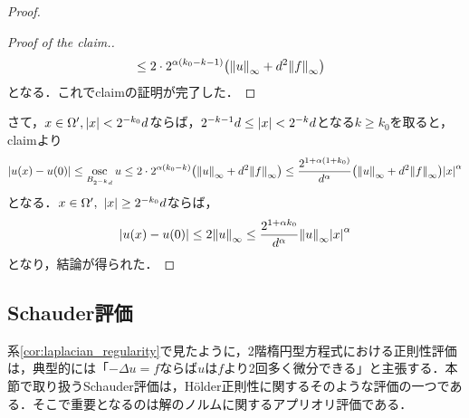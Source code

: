 \documentclass[a4paper]{ltjsarticle}
\newcommand{\Om}{\Omega}
\newcommand{\1}{\mathbbm{1}}
\DeclareMathOperator*{\osc}{\mathrm{osc}}
\numberwithin{equation}{section}
\theoremstyle{definition}
\begin{document}
\begin{proof}
\begin{proof}[Proof of the claim.]
\begin{align}
            &\leq 2\cdot 2^{\alpha(k_0-k-1)}\qty(\norm{u}_{\infty}+d^2\norm{f}_{\infty}) 
        \end{align}
        となる．これでclaimの証明が完了した．
    \end{proof}
    さて，$x\in \Om',\abs{x}<2^{-k_0}d$ならば，$2^{-k-1}d\leq \abs{x}<2^{-k}d$となる$k\geq k_0$を取ると，claimより
    \begin{equation}
        \abs{u(x)-u(0)}\leq \osc_{B_{2^{-k}d}}u\leq 2\cdot2^{\alpha(k_0-k)}\qty(\norm{u}_{\infty}+d^2\norm{f}_{\infty})\leq \frac{2^{1+\alpha(1+k_0)}}{d^\alpha}\qty(\norm{u}_{\infty}+d^2\norm{f}_{\infty})\abs{x}^\alpha 
    \end{equation}
    となる．$x\in \Om',\ \abs{x}\geq 2^{-k_0}d$ならば，
    \begin{equation}
        \abs{u(x)-u(0)}\leq 2\norm{u}_{\infty}\leq \frac{2^{1+\alpha k_0}}{d^\alpha}\norm{u}_{\infty}\abs{x}^\alpha 
    \end{equation}
    となり，結論が得られた．
\end{proof}
\subsection{Schauder評価}
系\ref{cor:laplacian_regularity}で見たように，2階楕円型方程式における正則性評価は，典型的には「$-\Delta u=f$ならば$u$は$f$より2回多く微分できる」と主張する．本節で取り扱うSchauder評価は，Hölder正則性に関するそのような評価の一つである．そこで重要となるのは解のノルムに関するアプリオリ評価である．
\end{document}
